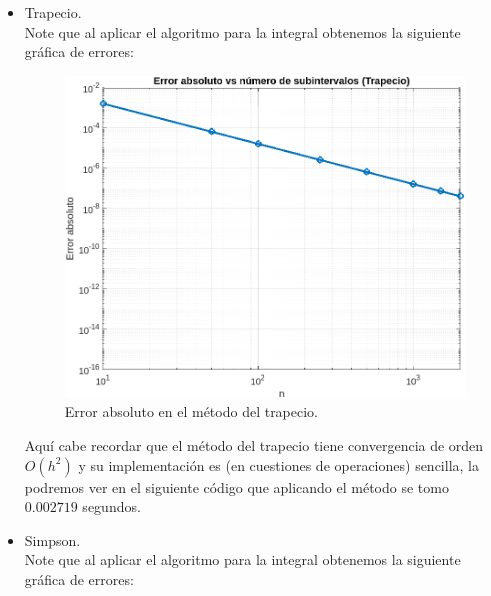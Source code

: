 \begin{homeworkProblem}
\begin{enumerate}
\begin{solucion}
\begin{itemize}
            \newpage
            
            \newpage
          \item Trapecio.\\
            Note que al aplicar el algoritmo para la integral obtenemos la siguiente gráfica de errores:
            \begin{figure}[H]
            \begin{center}
              \includegraphics[scale=0.7]{Figures/trapecio.png}
            \end{center}
            \caption{Error absoluto en el método del trapecio.}
            \end{figure}
            Aquí cabe recordar que el método del trapecio tiene convergencia de orden $O(h^2)$ y su implementación es (en cuestiones de operaciones) sencilla, la podremos ver en el siguiente código que aplicando el método se tomo $0.002719$ segundos.
            \newpage
            
            \newpage
          \item Simpson.\\
            Note que al aplicar el algoritmo para la integral obtenemos la siguiente gráfica de errores:
            \begin{figure}[H]
            \begin{center}

\end{center}
\end{figure}
\end{itemize}
\end{solucion}
\end{enumerate}
\end{homeworkProblem}
